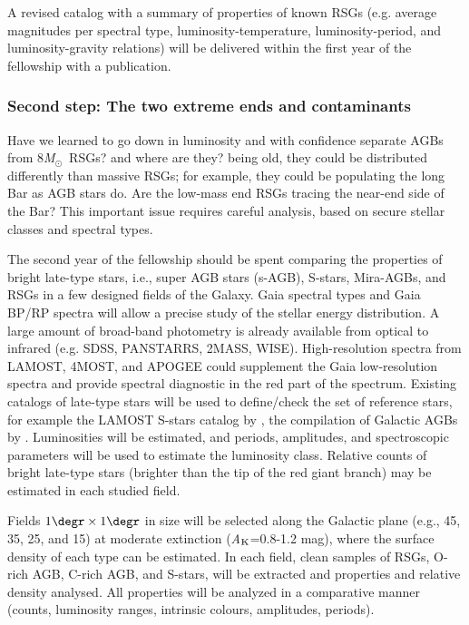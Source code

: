 \documentclass[final,11pt,onecolumn,a4paper,twoside]{scrbook_gj}
\newcommand{\Msun}{$\mathcal{M}_\odot$}
\def\Msun{\hbox{\it M$_\odot$}}
\def\Msun{\hbox{\it M$_\odot$}}
\newcommand{\Ak}{{\it A$_{\rm K}$}}
\begin{document}
A revised catalog with a summary  of properties of known RSGs 
(e.g. average magnitudes per spectral type,
luminosity-temperature, luminosity-period,  
and luminosity-gravity relations)
will be delivered within the first year
of the fellowship with a publication.  

\subsubsection{Second step: The two extreme ends and contaminants}
Have we learned to go down in luminosity and 
with confidence separate AGBs from 8\Msun\ RSGs?
and where are they? being old, they could be distributed
differently than massive RSGs; for example, they could 
be  populating the long Bar as AGB stars do.
Are the low-mass end RSGs tracing the near-end side 
of the Bar?
This important issue requires  careful analysis,
based on  secure stellar classes and spectral types.

The second year of the fellowship should be
spent comparing the properties of bright late-type 
stars, i.e., super AGB stars (s-AGB), S-stars, Mira-AGBs, 
and RSGs in a few designed fields of the Galaxy.
Gaia spectral types and    Gaia BP/RP spectra 
will allow a precise study of the stellar energy distribution.
A large amount of broad-band photometry is already available
from optical to infrared (e.g. SDSS, PANSTARRS, 2MASS, WISE).
High-resolution spectra from LAMOST, 4MOST, and APOGEE could 
supplement the Gaia low-resolution spectra 
and provide spectral diagnostic
in the red part of the spectrum.
Existing catalogs of late-type stars
will be  used to define/check the  set of reference stars,
for example the LAMOST S-stars catalog by \citet{chen22},
the compilation of Galactic AGBs  by \citet{suh21}.
Luminosities will be estimated, and periods, amplitudes, and 
spectroscopic parameters will be used 
to estimate the luminosity class. 
Relative counts of bright late-type stars 
(brighter than the tip of the red giant branch)
may be estimated in each studied field.

Fields $1\degr \times 1\degr $ in size will be selected
along the Galactic plane 
(e.g., 45\degr, 35\degr, 25\degr, and 15\degr)
at moderate extinction (\Ak=0.8-1.2 mag), where 
the surface density of each type can be estimated. 
In each field,  clean samples of RSGs, O-rich AGB, C-rich AGB, 
and S-stars, will be extracted and properties and 
relative density analysed. All properties will 
be analyzed in a comparative manner (counts, luminosity ranges,
intrinsic colours, amplitudes, periods). 
\end{document}
